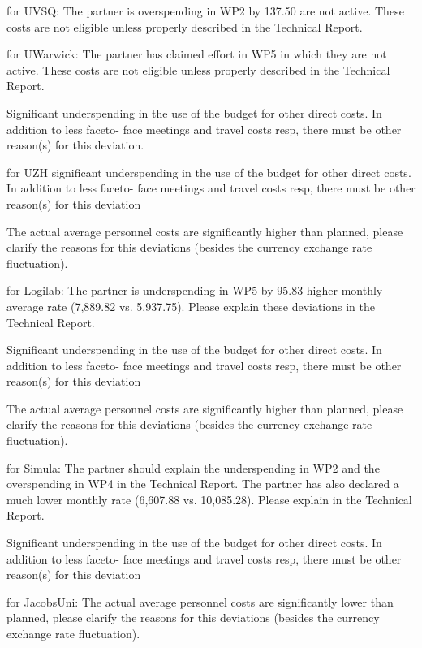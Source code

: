 for UVSQ:
The partner is overspending in WP2 by 137.50%
are not active. These costs are not eligible unless properly described in the Technical Report.

for UWarwick:
The partner has claimed effort in WP5 in which they are not active. These costs are not eligible
unless properly described in the Technical Report.

Significant underspending in the use of the budget for other direct costs. In addition to less faceto-
face meetings and travel costs resp, there must be other reason(s) for this deviation.

for UZH
significant underspending in the use of the budget for other direct costs. In addition to less faceto-
face meetings and travel costs resp, there must be other reason(s) for this deviation

The actual average personnel costs are significantly higher than planned, 
please clarify the reasons for this deviations (besides the currency exchange rate fluctuation).

for Logilab:
The partner is underspending in WP5 by 95.83%
higher monthly average rate (7,889.82 vs. 5,937.75). Please explain these deviations in the
Technical Report.

Significant underspending in the use of the budget for other direct costs. In addition to less faceto-
face meetings and travel costs resp, there must be other reason(s) for this deviation

The actual average personnel costs are significantly higher than planned, 
please clarify the reasons for this deviations (besides the currency exchange rate fluctuation).

for Simula:
The partner should explain the underspending in WP2 and the overspending in WP4 in the
Technical Report. The partner has also declared a much lower monthly rate (6,607.88 vs. 10,085.28). Please explain in the Technical Report.

Significant underspending in the use of the budget for other direct costs. In addition to less faceto-
face meetings and travel costs resp, there must be other reason(s) for this deviation



for JacobsUni:
The actual average personnel costs are significantly lower than planned, 
please clarify the reasons for this deviations (besides the currency exchange rate fluctuation).

